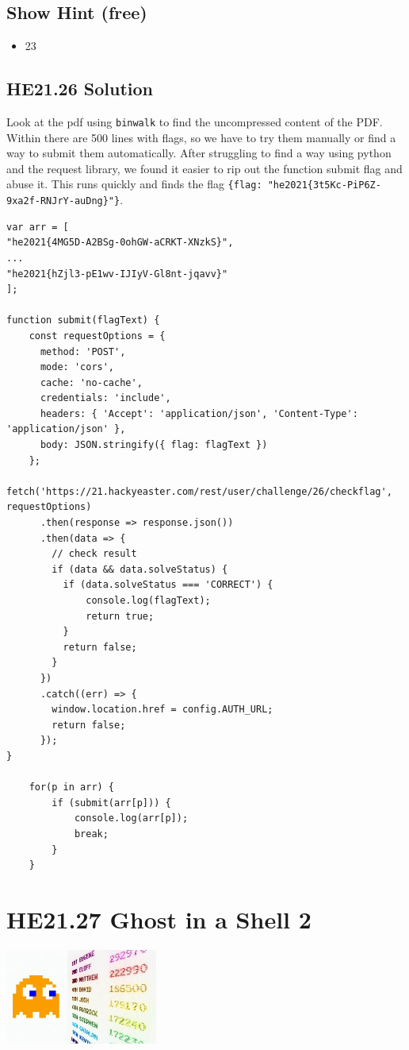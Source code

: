 \documentclass[english,a4paper,nols,noindent]{tufte-handout}
\begin{document}
\subsection{Show Hint (free)}
\begin{itemize}
\item 23
\end{itemize}

\hypertarget{he21.26-solution}{%
\subsection{HE21.26 Solution}\label{he21.26-solution}}

\noindent Look at the pdf using \verb+binwalk+ to find the uncompressed content
of the PDF.  Within there are 500 lines with flags, so we have to try them
manually or find a way to submit them automatically.  After struggling to find
a way using python and the request library, we found it easier to rip out the
function submit flag and abuse it.  This runs quickly and finds the flag
\verb+{flag: "he2021{3t5Kc-PiP6Z-9xa2f-RNJrY-auDng}"}+.

\begin{verbatim}
var arr = [
"he2021{4MG5D-A2BSg-0ohGW-aCRKT-XNzkS}",
...
"he2021{hZjl3-pE1wv-IJIyV-Gl8nt-jqavv}"
];

function submit(flagText) {
    const requestOptions = {
      method: 'POST',
      mode: 'cors',
      cache: 'no-cache',
      credentials: 'include',
      headers: { 'Accept': 'application/json', 'Content-Type': 'application/json' },
      body: JSON.stringify({ flag: flagText })
    };
    fetch('https://21.hackyeaster.com/rest/user/challenge/26/checkflag', requestOptions)
      .then(response => response.json())
      .then(data => {
        // check result
        if (data && data.solveStatus) {
          if (data.solveStatus === 'CORRECT') {
              console.log(flagText);
              return true;
          }
          return false;
        }
      })
      .catch((err) => {
        window.location.href = config.AUTH_URL;
        return false;
      });
}

    for(p in arr) {
        if (submit(arr[p])) {
            console.log(arr[p]);
            break;
        }
    }
\end{verbatim} 

\hypertarget{he21.27}{%
  \section{HE21.27 Ghost in a Shell 2}
  \label{he21.27}}
\begin{marginfigure}
    \includegraphics[width=50mm]{images/challenge27.jpg}
\end{marginfigure}
\end{document}
